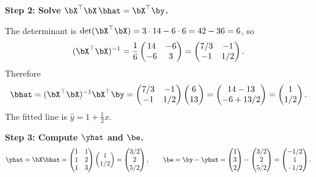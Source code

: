 \begin{example}
\medskip\noindent\textbf{Step 2: Solve $\bX^\top\bX\,\bhat = \bX^\top\by$.}

The determinant is $\det(\bX^\top\bX) = 3\cdot 14 - 6\cdot 6 = 42 - 36 = 6$, so
\[
(\bX^\top\bX)^{-1}
= \frac{1}{6}\begin{pmatrix} 14 & -6 \\ -6 & 3 \end{pmatrix}
= \begin{pmatrix} 7/3 & -1 \\ -1 & 1/2 \end{pmatrix}.
\]
Therefore
\[
\bhat = (\bX^\top\bX)^{-1}\bX^\top\by
= \begin{pmatrix} 7/3 & -1 \\ -1 & 1/2 \end{pmatrix}
  \begin{pmatrix} 6 \\ 13 \end{pmatrix}
= \begin{pmatrix} 14 - 13 \\ -6 + 13/2 \end{pmatrix}
= \begin{pmatrix} 1 \\ 1/2 \end{pmatrix}.
\]
The fitted line is $\hat{y} = 1 + \tfrac{1}{2}x$.

\medskip\noindent\textbf{Step 3: Compute $\yhat$ and $\be$.}
\[
\yhat = \bX\bhat
= \begin{pmatrix} 1 & 1 \\ 1 & 2 \\ 1 & 3 \end{pmatrix}
  \begin{pmatrix} 1 \\ 1/2 \end{pmatrix}
= \begin{pmatrix} 3/2 \\ 2 \\ 5/2 \end{pmatrix}, \qquad
\be = \by - \yhat
= \begin{pmatrix} 1 \\ 3 \\ 2 \end{pmatrix} - \begin{pmatrix} 3/2 \\ 2 \\ 5/2 \end{pmatrix}
= \begin{pmatrix} -1/2 \\ 1 \\ -1/2 \end{pmatrix}.
\]


\end{example}
